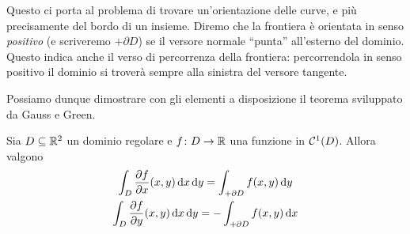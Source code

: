 Questo ci porta al problema di trovare un'orientazione delle curve, e più precisamente del bordo di un insieme.
Diremo che la frontiera è orientata in senso \emph{positivo} (e scriveremo $+\partial D$) se il versore normale ``punta'' all'esterno del dominio.
Questo indica anche il verso di percorrenza della frontiera: percorrendola in senso positivo il dominio si troverà sempre alla sinistra del versore tangente.

Possiamo dunque dimostrare con gli elementi a disposizione il teorema sviluppato da Gauss e Green.
\begin{teorema} \label{t:gauss-green}
	Sia $D\subseteq\mathbb{R}^2$ un dominio regolare e $f\colon D\to\mathbb{R}$ una funzione in $\mathcal{C}^{{1}}(D)$.
	Allora valgono
	\begin{gather}
		\int_D\frac{\partial {f}}{\partial {x}}(x,y)\,\textup{d} x\,\textup{d} y=\int_{+\partial D}f(x,y)\,\textup{d} y
		\label{eq:gauss-green-y}\\
		\int_D\frac{\partial {f}}{\partial {y}}(x,y)\,\textup{d} x\,\textup{d} y=-\int_{+\partial D}f(x,y)\,\textup{d} x
		\label{eq:gauss-green-x}
	\end{gather}
\end{teorema}
